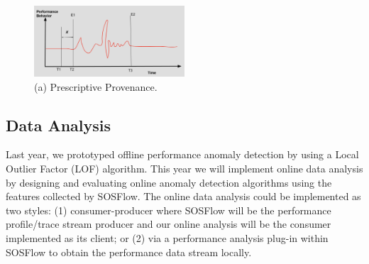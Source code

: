 \begin{figure}[th!]
 \centering
  \includegraphics[width=0.5\textwidth]{Figs/Provenance}
 \caption{(a) Prescriptive Provenance.}
\label{designfig:2}     
 \end{figure}

\subsection{Data Analysis}
Last year, we prototyped offline performance anomaly detection by using a Local Outlier Factor (LOF) algorithm. This year we will implement online data analysis by designing and evaluating online anomaly detection algorithms using the features collected by SOSFlow.  The online data analysis could be implemented as two styles: (1) consumer-producer where SOSFlow will be the performance profile/trace stream producer and our online analysis will be the consumer implemented as its client; or (2) via a performance analysis plug-in within SOSFlow to obtain the performance data stream locally.

